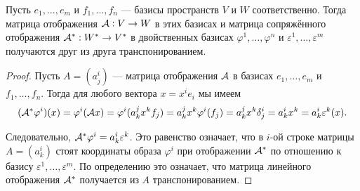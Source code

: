 \begin{proposal}
    Пусть $e_1, \ldots, e_m$ и $f_1, \ldots, f_n$ --- базисы пространств $V$ и $W$ соответственно. Тогда матрица отображения $\mathcal{A}: V \to W$ в этих базисах и матрица сопряжённого отображения $\mathcal{A}^\ast: W^\ast \to V^\ast$ в двойственных базисах $\varphi^1, \ldots, \varphi^n$ и $\varepsilon^1, \ldots, \varepsilon^m$ получаются друг из друга транспонированием.
\end{proposal}

\begin{proof}
    Пусть $A = (a^i_j)$ --- матрица отображения $\mathcal{A}$ в базисах $e_1, \ldots, e_m$ и $f_1, \ldots, f_n$. Тогда для любого вектора $x = x^ie_i$ мы имеем
    \[
        (\mathcal{A}^\ast\varphi^i)(x) = \varphi^i(\mathcal{A} x) = \varphi^i(a^j_kx^kf_j) = a^j_kx^k\varphi^i(f_j) = a^j_kx^k\delta^i_j = a^i_kx^k = a^i_k\varepsilon^k(x).
    \]

    Следовательно, $\mathcal{A}^\ast\varphi^i = a^i_k\varepsilon^k$. Это равенство означает, что в $i$-ой строке матрицы $A = (a^i_k)$ стоят координаты образа $\varphi^i$ при отображении $\mathcal{A}^\ast$ по отношению к базису $\varepsilon^1, \ldots, \varepsilon^m$. По определению это означает, что матрица линейного отображения $\mathcal{A}^\ast$ получается из $A$ транспонированием.
\end{proof}

